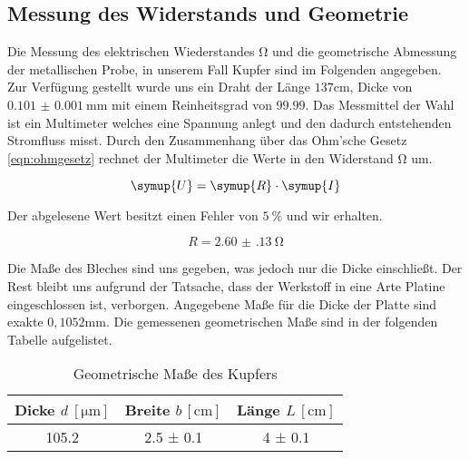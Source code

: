 \subsection{Messung des Widerstands und Geometrie}
\label{sec:aufgabe_a}
Die Messung des elektrischen Wiederstandes $\si{\ohm}$ und die geometrische Abmessung der metallischen Probe, in unserem Fall Kupfer sind im Folgenden angegeben.
Zur Verfügung gestellt wurde uns ein Draht der Länge $137\si{\cm}$, Dicke von $\SI{0.101(1)}{\milli\meter}$ mit einem Reinheitsgrad von $99.99$. 
Das Messmittel der Wahl ist ein Multimeter welches eine Spannung anlegt und den dadurch entstehenden Stromfluss misst.
Durch den Zusammenhang über das Ohm'sche Gesetz \eqref{eqn:ohmgesetz} rechnet der Multimeter die Werte in den Widerstand $\si{\ohm}$ um.

\begin{equation}
   \symup{U} = \symup{R} \cdot \symup{I}
\end{equation}

Der abgelesene Wert besitzt einen Fehler von $\SI{5}{\percent}$ und wir erhalten.

\begin{equation}
\label{eqn:ohmgesetz}
R = \SI{2.60(13)}{\ohm}
\end{equation}

Die Maße des Bleches sind uns gegeben, was jedoch nur die Dicke einschließt. %
Der Rest bleibt uns aufgrund der Tatsache, dass der Werkstoff in eine Arte Platine eingeschlossen ist, verborgen.
Angegebene Maße für die Dicke der Platte sind exakte $0,1052\si{\mm}$.
Die gemessenen geometrischen Maße sind in der folgenden Tabelle aufgelistet.

\begin{table}
  \centering
  \caption{Geometrische Maße des Kupfers}
  \label{tab:kupfergeo}
  \begin{tabular}{c c c}
    Dicke {$d \: [\si{\micro\meter}]$} & Breite $b \, [\si{\centi\meter}]$ & Länge $L \, [\si{\centi\meter}]$ \\
    \midrule
    105.2   & 2.5 ± 0.1 & 4 ± 0.1 \\
    \bottomrule
  \end{tabular}
\end{table}